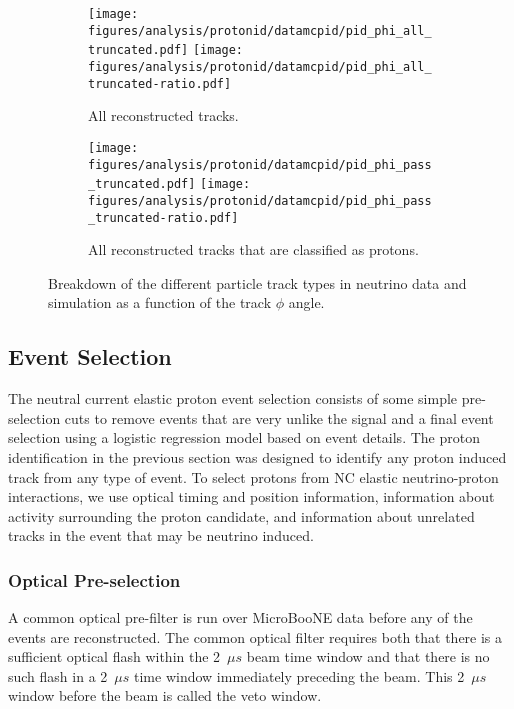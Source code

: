     \begin{figure}[h]
      \centering
      \begin{subfigure}[t]{2.8in}
        \texttt{[image: figures/analysis/protonid/datamcpid/pid\_phi\_all\_truncated.pdf]}
        \texttt{[image: figures/analysis/protonid/datamcpid/pid\_phi\_all\_truncated-ratio.pdf]}
        \caption{All reconstructed tracks.}
      \end{subfigure}
      \hspace{2pt}
      \begin{subfigure}[t]{2.8in}
        \texttt{[image: figures/analysis/protonid/datamcpid/pid\_phi\_pass\_truncated.pdf]}
        \texttt{[image: figures/analysis/protonid/datamcpid/pid\_phi\_pass\_truncated-ratio.pdf]}
        \caption{All reconstructed tracks that are classified as protons.}
      \end{subfigure}
      \caption{Breakdown of the different particle track types in neutrino data
      and simulation as a function of the track $\phi$ angle.}
      \label{fig:pidphi}
    \end{figure}

    \FloatBarrier


\subsection{Event Selection}\label{sec:selection}
  The neutral current elastic proton event selection consists of some simple
  pre-selection cuts to remove events that are very unlike the signal and a
  final event selection using a logistic regression model based on event
  details. The proton identification in the previous section was designed to
  identify any proton induced track from any type of event. To select protons
  from NC elastic neutrino-proton interactions, we use optical timing and
  position information, information about activity surrounding the proton
  candidate, and information about unrelated tracks in the event that may be
  neutrino induced.

  \subsubsection{Optical Pre-selection}\label{sec:optpresel}
    A common optical pre-filter is run over MicroBooNE data before any of the
    events are reconstructed. The common optical filter requires both that
    there is a sufficient optical flash within the 2~$\mu s$ beam time window
    and that there is no such flash in a 2~$\mu s$ time window immediately
    preceding the beam. This 2~$\mu s$ window before the beam is called the
    veto window.

